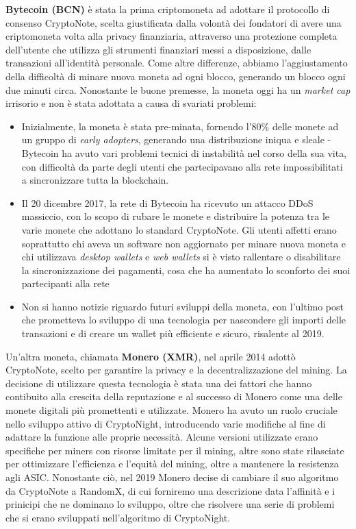 \textbf{Bytecoin (BCN)} è stata la prima criptomoneta ad adottare il
protocollo di consenso CryptoNote, scelta giustificata dalla volontà dei
fondatori di avere una criptomoneta volta alla privacy finanziaria,
attraverso una protezione completa dell'utente che utilizza gli
strumenti finanziari messi a disposizione, dalle transazioni
all'identità personale. Come altre differenze, abbiamo l'aggiustamento
della difficoltà di minare nuova moneta ad ogni blocco, generando un
blocco ogni due minuti circa. Nonostante le buone premesse, la moneta
oggi ha un \emph{market cap} irrisorio e non è stata adottata a causa di
svariati problemi:
\begin{itemize}
  \item Inizialmente, la moneta è stata pre-minata,
  fornendo l'80\% delle monete ad un gruppo di \emph{early adopters},
  generando una distribuzione iniqua e sleale - Bytecoin ha avuto vari
  problemi tecnici di instabilità nel corso della sua vita, con difficoltà
  da parte degli utenti che partecipavano alla rete impossibilitati a
  sincronizzare tutta la blockchain.
  \item Il 20 dicembre 2017, la rete di
  Bytecoin ha ricevuto un attacco DDoS massiccio, con lo scopo di rubare
  le monete e distribuire la potenza tra le varie monete che adottano lo
  standard CryptoNote. Gli utenti affetti erano soprattutto chi aveva un
  software non aggiornato per minare nuova moneta e chi utilizzava
  \emph{desktop wallets} e \emph{web wallets} si è visto rallentare o
  disabilitare la sincronizzazione dei pagamenti, cosa che ha aumentato lo
  sconforto dei suoi partecipanti alla rete
  \item  Non si hanno notizie
  riguardo futuri sviluppi della moneta, con l'ultimo post che prometteva
  lo sviluppo di una tecnologia per nascondere gli importi delle
  transazioni e di creare un wallet più efficiente e sicuro, risalente al
  2019.
\end{itemize}

Un'altra moneta, chiamata \textbf{Monero (XMR)}, nel aprile 2014 adottò
CryptoNote, scelto per garantire la privacy e la decentralizzazione del
mining. La decisione di utilizzare questa tecnologia è stata una dei
fattori che hanno contibuito alla crescita della reputazione e al
successo di Monero come una delle monete digitali più promettenti e
utilizzate. Monero ha avuto un ruolo cruciale nello sviluppo attivo di
CryptoNight, introducendo varie modifiche al fine di adattare la
funzione alle proprie necessità. Alcune versioni utilizzate erano
specifiche per miners con risorse limitate per il mining, altre sono
state rilasciate per ottimizzare l'efficienza e l'equità del mining,
oltre a mantenere la resistenza agli ASIC. Nonostante ciò, nel 2019
Monero decise di cambiare il suo algoritmo da CryptoNote a RandomX, di
cui forniremo una descrizione data l'affinità e i prinicipi che ne
dominano lo sviluppo, oltre che risolvere una serie di problemi che si
erano sviluppati nell'algoritmo di CryptoNight.


